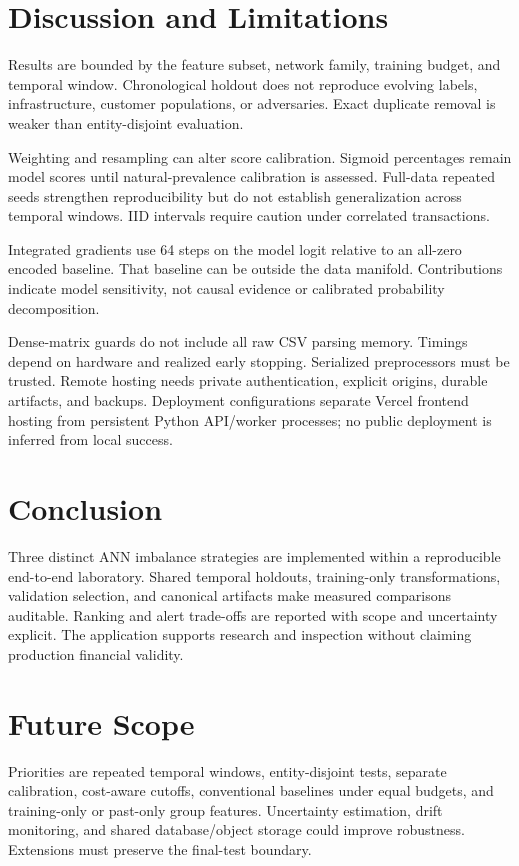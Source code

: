 \documentclass[11pt,a4paper]{article}
\begin{document}


\section{Discussion and Limitations}
Results are bounded by the feature subset, network family, training budget, and temporal window. Chronological holdout does not reproduce evolving labels, infrastructure, customer populations, or adversaries. Exact duplicate removal is weaker than entity-disjoint evaluation.

Weighting and resampling can alter score calibration. Sigmoid percentages remain model scores until natural-prevalence calibration is assessed. Full-data repeated seeds strengthen reproducibility but do not establish generalization across temporal windows. IID intervals require caution under correlated transactions.

Integrated gradients use 64 steps on the model logit relative to an all-zero encoded baseline. That baseline can be outside the data manifold. Contributions indicate model sensitivity, not causal evidence or calibrated probability decomposition.

Dense-matrix guards do not include all raw CSV parsing memory. Timings depend on hardware and realized early stopping. Serialized preprocessors must be trusted. Remote hosting needs private authentication, explicit origins, durable artifacts, and backups. Deployment configurations separate Vercel frontend hosting from persistent Python API/worker processes; no public deployment is inferred from local success.

\section{Conclusion}
Three distinct ANN imbalance strategies are implemented within a reproducible end-to-end laboratory. Shared temporal holdouts, training-only transformations, validation selection, and canonical artifacts make measured comparisons auditable. Ranking and alert trade-offs are reported with scope and uncertainty explicit. The application supports research and inspection without claiming production financial validity.

\section{Future Scope}
Priorities are repeated temporal windows, entity-disjoint tests, separate calibration, cost-aware cutoffs, conventional baselines under equal budgets, and training-only or past-only group features. Uncertainty estimation, drift monitoring, and shared database/object storage could improve robustness. Extensions must preserve the final-test boundary.

\clearpage


\end{document}
